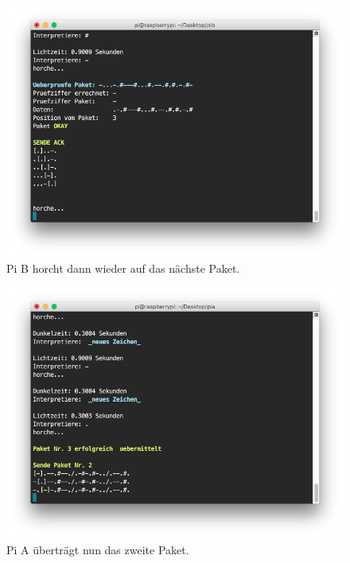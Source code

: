 \documentclass[12pt, a4paper]{article}
\begin{document}
\newpage
\begin{figure}[H]
	\centering
	\includegraphics[width=1.0\textwidth]{sshot_34.png}
	\caption{Pi B horcht dann wieder auf das nächste Paket.}
\end{figure}




\newpage
\begin{figure}[H]
	\centering
	\includegraphics[width=1.0\textwidth]{sshot_35.png}
	\caption{Pi A überträgt nun das zweite Paket.}
\end{figure}
\end{document}
